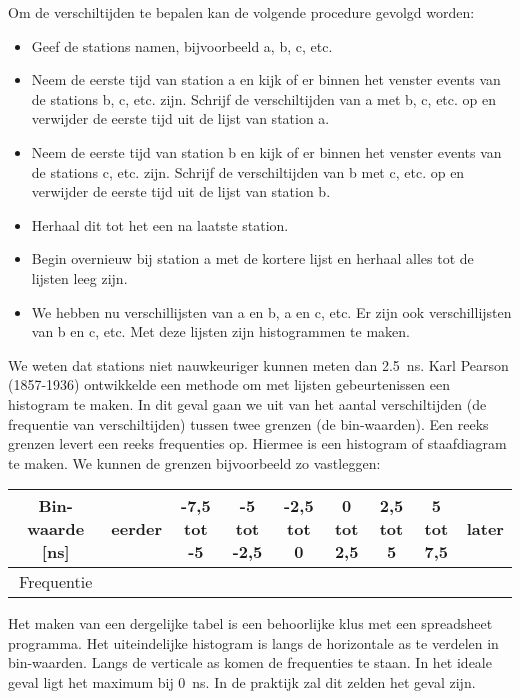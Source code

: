 Om de verschiltijden te bepalen kan de volgende procedure gevolgd
worden:
\begin{itemize}
\item Geef de stations namen, bijvoorbeeld a, b, c, etc.
\item Neem de eerste tijd van station a en kijk of er binnen het venster
events van de stations b, c, etc. zijn. Schrijf de verschiltijden
van a met b, c, etc. op en verwijder de eerste tijd uit de lijst van
station a.
\item Neem de eerste tijd van station b en kijk of er binnen het venster
events van de stations c, etc. zijn. Schrijf de verschiltijden van
b met c, etc. op en verwijder de eerste tijd uit de lijst van station
b.
\item Herhaal dit tot het een na laatste station.
\item Begin overnieuw bij station a met de kortere lijst en herhaal alles
tot de lijsten leeg zijn.
\item We hebben nu verschillijsten van a en b, a en c, etc. Er zijn ook
verschillijsten van b en c, etc. Met deze lijsten zijn histogrammen
te maken. 
\end{itemize}
We weten dat stations niet nauwkeuriger kunnen meten dan
\SI{2,5}{\nano\second}. Karl Pearson (1857-1936) \cite{wiki} ontwikkelde
een methode om met lijsten gebeurtenissen een histogram te maken. In dit
geval gaan we uit van het aantal verschiltijden (de frequentie van
verschiltijden) tussen twee grenzen (de bin-waarden). Een reeks grenzen
levert een reeks frequenties op. Hiermee is een histogram of
staafdiagram te maken. We kunnen de grenzen bijvoorbeeld zo vastleggen:

\bigskip{}
\begin{tabular}{|c|c|c|c|c|c|c|c|c|}
\hline 
Bin-waarde {[}ns{]} & eerder & -7,5 tot -5 & -5 tot -2,5 & -2,5 tot 0 & 0 tot 2,5 & 2,5 tot 5 & 5 tot 7,5 & later\tabularnewline
\hline 
Frequentie &  &  &  &  &  &  &  & \tabularnewline
\hline 
\end{tabular}

\bigskip{}

Het maken van een dergelijke tabel is een behoorlijke klus met een
spreadsheet programma. Het uiteindelijke histogram is langs de horizontale
as te verdelen in bin-waarden. Langs de verticale as komen de frequenties
te staan. In het ideale geval ligt het maximum bij \SI{0}{\nano\second}.
In de praktijk zal dit zelden het geval zijn.

\bigskip{}


